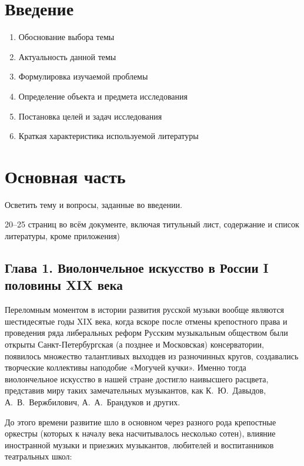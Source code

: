 \documentclass[12pt,a4paper,oneside,titlepage,draft]{extreport}
\begin{document}
	\chapter*{Введение}
	
	\begin{enumerate}
	\item Обоснование выбора темы
	\item Актуальность данной темы
	\item Формулировка изучаемой проблемы
	\item Определение объекта и предмета исследования
	\item Постановка целей и задач исследования
	\item Краткая характеристика используемой литературы
	\end{enumerate}	
	
		
	
	\chapter*{Основная часть}
		
		Осветить тему и вопросы, заданные во введении.
		
		20–25 страниц во всём документе, включая титульный лист, содержание и список литературы, кроме приложения)

	\section*{Глава 1. Виолончельное искусство в России I половины XIX века}
		
		Переломным моментом в истории развития русской музыки вообще являются шестидесятые годы XIX века, когда вскоре после отмены крепостного права и проведения ряда либеральных реформ Русским музыкальным обществом были открыты Санкт-Петербургская (а позднее и Московская) консерватории, появилось множество талантливых выходцев из разночинных кругов, создавались творческие коллективы наподобие «Могучей кучки». %
		Именно тогда виолончельное искусство в нашей стране достигло наивысшего расцвета, представив миру таких замечательных музыкантов, как К.~Ю.~Давыдов, А.~В.~Вержбилович, А.~А.~Брандуков и других. 
		
		До этого времени развитие шло в основном через разного рода крепостные оркестры (которых к началу века насчитывалось несколько сотен), влияние иностранной музыки и приезжих музыкантов, любителей и воспитанников театральных школ:
		
\end{document}
